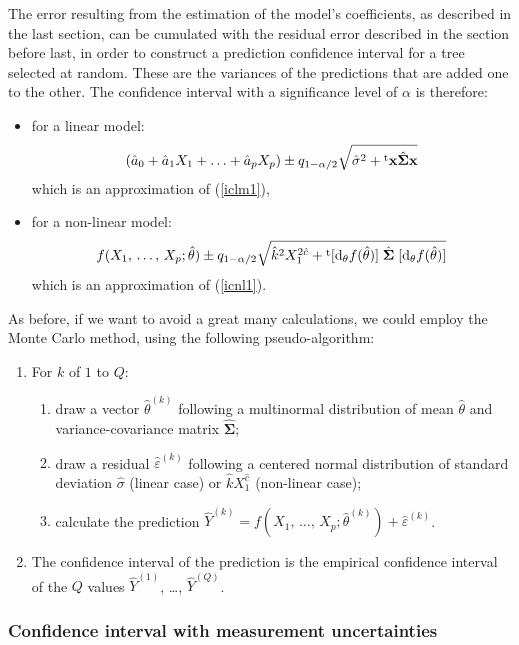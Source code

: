 The error resulting from the estimation of the model's coefficients, as described in the last section, can be cumulated with the residual error described in the section before last, in order to construct a prediction confidence interval for a tree selected at random. These are the variances of the predictions that are added one to the other. The confidence interval with a significance level of $\alpha$ is therefore:
\begin{itemize}
\item for a linear model:
\[
(\hat{a}_0+\hat{a}_1X_1+\ldots+\hat{a}_pX_p)\pm
q_{1-\alpha/2}\sqrt{\hat{\sigma}^2+{}^{\mathrm{t}}\mathbf{x}\hat{\boldsymbol{\Sigma}}\mathbf{x}}
\]
which is an approximation of (\ref{iclm1}),
\item for a non-linear model:
\[
f(X_1,\,\ldots,\,X_p;\hat{\theta})\pm q_{1-\alpha/2}
\sqrt{\hat{k}^2X_1^{2\hat{c}}+{}^{\mathrm{t}}[\mathrm{d}_{\theta}f(\hat{\theta})]\;
\hat{\boldsymbol{\Sigma}}\; [\mathrm{d}_{\theta}f(\hat{\theta})]}
\]
which is an approximation of (\ref{icnl1}).
\end{itemize}
As before, if we want to avoid a great many calculations, we could employ the Monte Carlo method, using the following pseudo-algorithm:
\begin{enumerate}
\item For $k$ of $1$ to $Q$:
    \begin{enumerate}
    \item draw a vector $\hat{\theta}^{(k)}$ following a multinormal distribution of mean $\hat{\theta}$ and variance-covariance matrix $\hat{\boldsymbol{\Sigma}}$;
    \item draw a residual $\hat{\varepsilon}^{(k)}$ following a centered normal distribution of standard deviation $\hat{\sigma}$ (linear case) or 
    $\hat{k}X_1^{\hat{c}}$ (non-linear case);
    \item calculate the prediction 
    $\hat{Y}^{(k)}=f(X_1,\,\ldots,\,X_p;\hat{\theta}^{(k)})+
    \hat{\varepsilon}^{(k)}$.
    \end{enumerate}
\item The confidence interval of the prediction is the empirical confidence interval of the $Q$ values $\hat{Y}^{(1)}$, \ldots,
$\hat{Y}^{(Q)}$.
\end{enumerate}

\subsubsection{Confidence interval with measurement uncertainties\label{errmes}}

